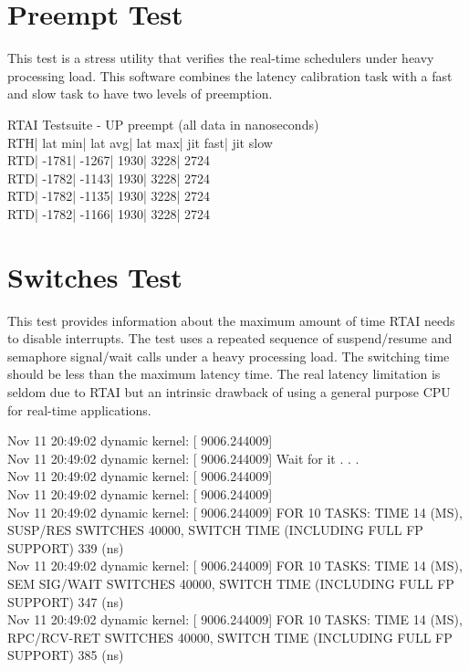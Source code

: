 \section{Preempt Test}
\label{Preempt Test}
This test is a stress utility that verifies the real-time schedulers under heavy processing load. This software combines the latency calibration task with a fast and slow task to have two levels of preemption.

\begin{maxipage}
\begin{example}
RTAI Testsuite - UP preempt (all data in nanoseconds)\\
RTH| lat min| lat avg| lat max| jit fast| jit slow\\
RTD| -1781| -1267| 1930| 3228| 2724\\
RTD| -1782| -1143| 1930| 3228| 2724\\
RTD| -1782| -1135| 1930| 3228| 2724\\
RTD| -1782| -1166| 1930| 3228| 2724\\
\end{example}
\end{maxipage}

\section{Switches Test}
\label{Switches Test}
This test provides information about the maximum amount of time RTAI needs to disable interrupts. The test uses a repeated sequence of suspend/resume and semaphore signal/wait calls under a heavy processing load. The switching time should be less than the maximum latency time. The real latency limitation is seldom due to RTAI but an intrinsic drawback of using a general purpose CPU for real-time applications.

\begin{maxipage}
\begin{example}
Nov 11 20:49:02 dynamic kernel: [ 9006.244009]\\
Nov 11 20:49:02 dynamic kernel: [ 9006.244009] Wait for it . . .\\
Nov 11 20:49:02 dynamic kernel: [ 9006.244009]\\
Nov 11 20:49:02 dynamic kernel: [ 9006.244009]\\
Nov 11 20:49:02 dynamic kernel: [ 9006.244009] FOR 10 TASKS: TIME 14 (MS), SUSP/RES SWITCHES 40000,
SWITCH TIME (INCLUDING FULL FP SUPPORT) 339 (ns)\\
Nov 11 20:49:02 dynamic kernel: [ 9006.244009] FOR 10 TASKS: TIME 14 (MS), SEM SIG/WAIT SWITCHES
40000, SWITCH TIME (INCLUDING FULL FP SUPPORT) 347 (ns)\\
Nov 11 20:49:02 dynamic kernel: [ 9006.244009] FOR 10 TASKS: TIME 14 (MS), RPC/RCV-RET SWITCHES
40000, SWITCH TIME (INCLUDING FULL FP SUPPORT) 385 (ns)\\
\end{example}
\end{maxipage}